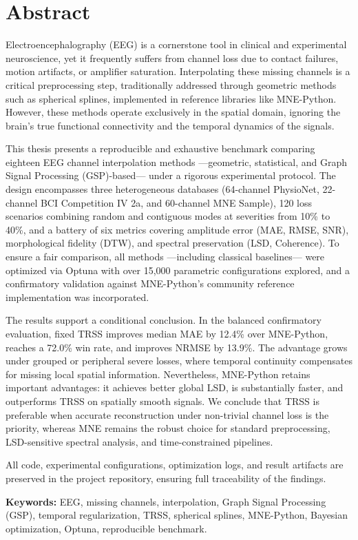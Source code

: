 \chapter*{Abstract}

Electroencephalography (EEG) is a cornerstone tool in clinical and experimental neuroscience, yet it frequently suffers from channel loss due to contact failures, motion artifacts, or amplifier saturation. Interpolating these missing channels is a critical preprocessing step, traditionally addressed through geometric methods such as spherical splines, implemented in reference libraries like MNE-Python. However, these methods operate exclusively in the spatial domain, ignoring the brain's true functional connectivity and the temporal dynamics of the signals.

This thesis presents a reproducible and exhaustive benchmark comparing eighteen EEG channel interpolation methods —geometric, statistical, and Graph Signal Processing (GSP)-based— under a rigorous experimental protocol. The design encompasses three heterogeneous databases (64-channel PhysioNet, 22-channel BCI Competition IV 2a, and 60-channel MNE Sample), 120 loss scenarios combining random and contiguous modes at severities from 10\% to 40\%, and a battery of six metrics covering amplitude error (MAE, RMSE, SNR), morphological fidelity (DTW), and spectral preservation (LSD, Coherence). To ensure a fair comparison, all methods —including classical baselines— were optimized via Optuna with over 15,000 parametric configurations explored, and a confirmatory validation against MNE-Python's community reference implementation was incorporated.

The results support a conditional conclusion. In the balanced confirmatory evaluation, fixed TRSS improves median MAE by 12.4\% over MNE-Python, reaches a 72.0\% win rate, and improves NRMSE by 13.9\%. The advantage grows under grouped or peripheral severe losses, where temporal continuity compensates for missing local spatial information. Nevertheless, MNE-Python retains important advantages: it achieves better global LSD, is substantially faster, and outperforms TRSS on spatially smooth signals. We conclude that TRSS is preferable when accurate reconstruction under non-trivial channel loss is the priority, whereas MNE remains the robust choice for standard preprocessing, LSD-sensitive spectral analysis, and time-constrained pipelines.

All code, experimental configurations, optimization logs, and result artifacts are preserved in the project repository, ensuring full traceability of the findings.

\vspace{1em}
\noindent\textbf{Keywords:} EEG, missing channels, interpolation, Graph Signal Processing (GSP), temporal regularization, TRSS, spherical splines, MNE-Python, Bayesian optimization, Optuna, reproducible benchmark.